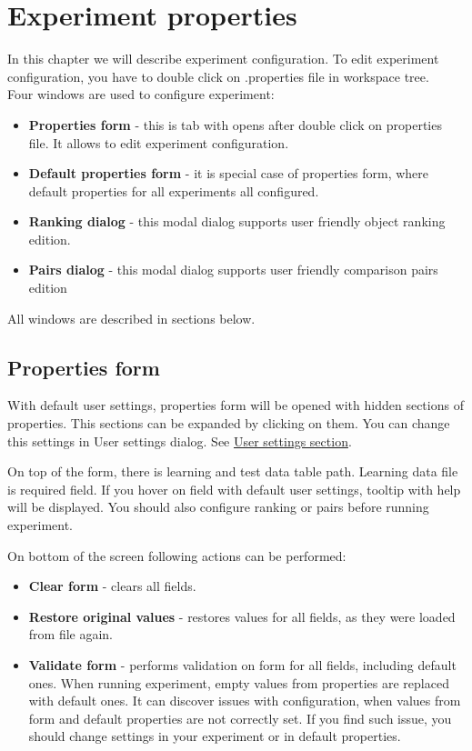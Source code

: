 \section{Experiment properties}\label{section:properties}

In this chapter we will describe experiment configuration. To edit experiment configuration, you have to double click on .properties file in workspace tree.\\

Four windows are used to configure experiment:
\begin{itemize}
	\item \textbf{Properties form} - this is tab with opens after double click on properties file. It allows to edit experiment configuration.
	\item \textbf{Default properties form} - it is special case of properties form, where default properties for all experiments all configured.
	\item \textbf{Ranking dialog} - this modal dialog supports user friendly object ranking edition.
	\item \textbf{Pairs dialog} - this modal dialog supports user friendly comparison pairs edition
\end{itemize}

All windows are described in sections below.

\subsection{Properties form}\label{sub:properties-form}

With default user settings, properties form will be opened with hidden sections of properties. This sections can be expanded by clicking on them. You can change this settings in User settings dialog. See \hyperref[section:user-settings]{User settings section}.

On top of the form, there is learning and test data table path. Learning data file is required field. If you hover on field with default user settings, tooltip with help will be displayed. You should also configure ranking or pairs before running experiment.

On bottom of the screen following actions can be performed:
\begin{itemize}
	\item \textbf{Clear form} - clears all fields.
	\item \textbf{Restore original values} - restores values for all fields, as they were loaded from file again.
	\item \textbf{Validate form} - performs validation on form for all fields, including default ones. When running experiment, empty values from properties are replaced with default ones. It can discover issues with configuration, when values from form and default properties are not correctly set. If you find such issue, you should change settings in your experiment or in default properties.
\end{itemize}

